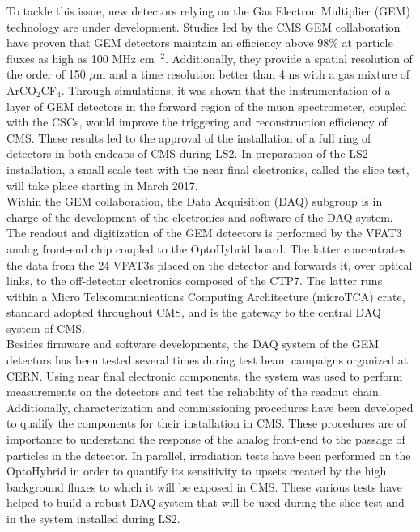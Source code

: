   To tackle this issue, new detectors relying on the Gas Electron Multiplier (GEM) technology are under development. Studies led by the CMS GEM collaboration have proven that GEM detectors maintain an efficiency above 98\% at particle fluxes as high as 100 MHz cm$^{-2}$. Additionally, they provide a spatial resolution of the order of 150 $\mu$m and a time resolution better than 4 ns with a gas mixture of ArCO$_2$CF$_4$. Through simulations, it was shown that the instrumentation of a layer of GEM detectors in the forward region of the muon spectrometer, coupled with the CSCs, would improve the triggering and reconstruction efficiency of CMS. These results led to the approval of the installation of a full ring of detectors in both endcaps of CMS during LS2. In preparation of the LS2 installation, a small scale test with the near final electronics, called the slice test, will take place starting in March 2017. \\

  Within the GEM collaboration, the Data Acquisition (DAQ) subgroup is in charge of the development of the electronics and software of the DAQ system. The readout and digitization of the GEM detectors is performed by the VFAT3 analog front-end chip coupled to the OptoHybrid board. The latter concentrates the data from the 24 VFAT3s placed on the detector and forwards it, over optical links, to the off-detector electronics composed of the CTP7. The latter runs within a Micro Telecommunications Computing Architecture (microTCA) crate, standard adopted throughout CMS, and is the gateway to the central DAQ system of CMS. \\

  Besides firmware and software developments, the DAQ system of the GEM detectors has been tested several times during test beam campaigns organized at CERN. Using near final electronic components, the system was used to perform measurements on the detectors and test the reliability of the readout chain. Additionally, characterization and commissioning procedures have been developed to qualify the components for their installation in CMS. These procedures are of importance to understand the response of the analog front-end to the passage of particles in the detector. In parallel, irradiation tests have been performed on the OptoHybrid in order to quantify its sensitivity to upsets created by the high background fluxes to which it will be exposed in CMS. These various tests have helped to build a robust DAQ system that will be used during the slice test and in the system installed during LS2. \\

